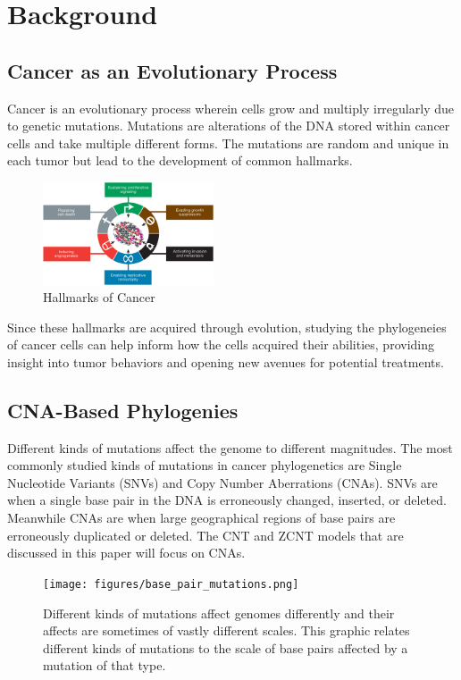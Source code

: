 \section{Background}

\subsection{Cancer as an Evolutionary Process}

Cancer is an evolutionary process wherein cells grow and multiply irregularly due to genetic mutations. Mutations are alterations of the DNA stored within cancer cells and take multiple different forms. The mutations are random and unique in each tumor but lead to the development of common hallmarks.

\begin{figure}[h]
    \centering
    \includegraphics[width=0.45\textwidth]{figures/hallmarks.jpg}
    \caption{Hallmarks of Cancer \cite{hallmarks_of_cancer}}
    \label{fig:hallmarks}
\end{figure}

Since these hallmarks are acquired through evolution, studying the phylogeneies of cancer cells can help inform how the cells acquired their abilities, providing insight into tumor behaviors and opening new avenues for potential treatments. 

\subsection{CNA-Based Phylogenies}

Different kinds of mutations affect the genome to different magnitudes. The most commonly studied kinds of mutations in cancer phylogenetics are Single Nucleotide Variants (SNVs) and Copy Number Aberrations (CNAs). SNVs are when a single base pair in the DNA is erroneously changed, inserted, or deleted. Meanwhile CNAs are when large geographical regions of base pairs are erroneously duplicated or deleted. The CNT and ZCNT models that are discussed in this paper will focus on CNAs. 

\begin{figure}[h]
    \centering
    \texttt{[image: figures/base\_pair\_mutations.png]}
    \caption{Different kinds of mutations affect genomes differently and their affects are sometimes of vastly different scales. This graphic relates different kinds of mutations to the scale of base pairs affected by a mutation of that type. \cite{lecture_2}}
    \label{fig:hallmarks}
\end{figure}

